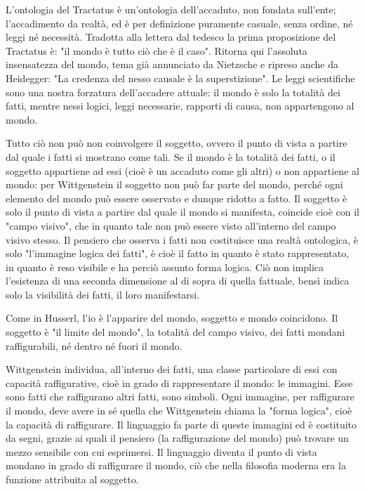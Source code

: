 L'ontologia del Tractatus è un'ontologia dell'accaduto,
non fondata sull'ente; l'accadimento da realtà, ed è
per definizione puramente casuale, senza ordine, né
leggi né necessità. Tradotta alla lettera dal tedesco la prima
proposizione del Tractatus è: "il mondo è tutto ciò
che è il caso".
Ritorna qui l'assoluta insensatezza del mondo, tema
già annunciato da Nietzsche e ripreso anche
da Heidegger: "La credenza del nesso causale è la
superstizione". Le leggi scientifiche sono una nostra
forzatura dell'accadere attuale: il mondo è solo
la totalità dei fatti, mentre nessi logici, leggi
necessarie, rapporti di causa, non appartengono al
mondo.

Tutto ciò non può non coinvolgere il soggetto, ovvero
il punto di vista a partire dal quale i fatti si mostrano
come tali. Se il mondo è la totalità dei fatti,
o il soggetto appartiene ad essi (cioè è un accaduto
come gli altri) o non appartiene al mondo: per Wittgenstein
il soggetto non può far parte del mondo, perché
ogni elemento del mondo può essere osservato e
dunque ridotto a fatto. Il soggetto è solo il punto di
vista a partire dal quale il mondo si manifesta,
coincide cioè con il "campo visivo", che in quanto
tale non può essere visto all'interno del campo
visivo stesso. Il pensiero che osserva i fatti non
costituisce una realtà ontologica, è solo
"l'immagine logica dei fatti", è cioè il fatto
in quanto è stato rappresentato, in quanto è reso
visibile e ha perciò assunto forma logica. Ciò non
implica l'esistenza di una seconda dimensione
al di sopra di quella fattuale, bensì indica solo
la visibilità dei fatti, il loro manifestarsi.

Come in Husserl, l'io è l'apparire del mondo,
soggetto e mondo coincidono.
Il soggetto è "il limite del mondo", la totalità del
campo visivo, dei fatti mondani raffigurabili, né
dentro né fuori il mondo.

Wittgenstein individua, all'interno dei fatti, una
classe particolare di essi con capacità raffigurative,
cioè in grado di rappresentare il mondo: le immagini.
Esse sono fatti che raffigurano altri fatti, sono
simboli. Ogni immagine, per raffigurare il mondo,
deve avere in sé quella che Wittgenstein chiama
la "forma logica", cioè la capacità di raffigurare.
Il linguaggio fa parte di queste immagini ed è
costituito da segni, grazie ai quali il pensiero
(la raffigurazione del mondo) può trovare un
mezzo sensibile con cui esprimersi. Il linguaggio
diventa il punto di vista mondano in grado di
raffigurare il mondo, ciò che nella filosofia
moderna era la funzione attribuita al soggetto.

